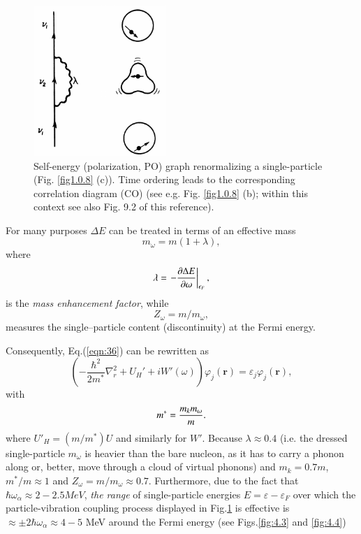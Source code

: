 \begin{figure}[h!]
\centerline {
\includegraphics*[width=5cm]{introduccion/figs/figintroD2}
}
\caption[Self-energy of a single-particle state.]{Self-energy (polarization, PO) graph renormalizing  a single-particle  (Fig. \ref{fig1.0.8} (c)). Time ordering leads to the corresponding correlation diagram (CO) (see e.g. Fig. \ref{fig1.0.8} (b); within this context see also \cite{Brink:05} Fig. 9.2 of this reference).}
\label{fig:4.2}
\end{figure}
For many purposes $\Delta E$ can be treated in terms of an effective mass 
\begin{equation}\label{eqn:38}
m_{\omega} = m(1+\lambda),
\end{equation}
where
\begin{equation}\label{eqn:39}
\lambda= \left.- \frac{\partial \Delta E}{\partial \omega}\right|_{\epsilon_F}, \idx{Mass enhancement factor}
\end{equation}
is the {\it mass enhancement factor}, while
\begin{equation}
\nonumber
Z_{\omega}=m/m_{\omega},
\end{equation}
measures the single--particle content (discontinuity) at the Fermi energy. 



Consequently, Eq.(\ref{eqn:36}) can be rewritten as
\begin{equation}
\left( - \frac{\hbar^2}{2m^*} \nabla_r^2 + U_H' + i W'(\omega) \right) \varphi_j(\mathbf r) = \varepsilon_j \varphi_j(\mathbf r),
\label{eqn:40a}
\end{equation}
with
\begin{equation}
m^* = \frac{m_k m_{\omega}}{m} .
\label{eqn:40b}\idx{Effective mass}
\end{equation}
 where $U'_H = (m/m^*) U$ and similarly for $W'$. Because $\lambda \approx 0.4$ (i.e. the dressed single-particle $m_{\omega}$ is heavier than the bare nucleon, as it has to carry a phonon along or, better, move through a cloud of virtual phonons) and $m_k=0.7m$, $m^*/m \approx 1$ and $Z_{\omega}=m/m_\omega\approx 0.7$. Furthermore, due to the fact that $\hbar \omega_{\alpha} \approx 2-2.5 MeV$, {\it the range} of single-particle energies $E=\varepsilon-\varepsilon_F$ over which the particle-vibration coupling process displayed in Fig.\ref{fig:4.2} is effective is $\approx \pm 2\hbar \omega_{\alpha} \approx 4-5$ MeV around the Fermi energy (see Figs.\ref{fig:4.3} and \ref{fig:4.4})

